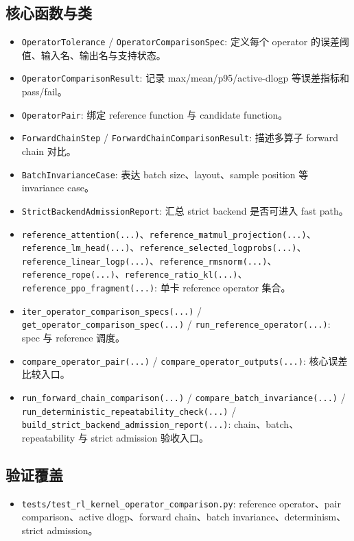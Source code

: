 \documentclass[11pt,a4paper]{ctexart}
\newcommand{\code}[1]{{\small\nolinkurl{#1}}}
\begin{document}
\subsection{核心函数与类}
\begin{itemize}
  \item \code{OperatorTolerance} / \code{OperatorComparisonSpec}: 定义每个 operator 的误差阈值、输入名、输出名与支持状态。
  \item \code{OperatorComparisonResult}: 记录 max/mean/p95/active-dlogp 等误差指标和 pass/fail。
  \item \code{OperatorPair}: 绑定 reference function 与 candidate function。
  \item \code{ForwardChainStep} / \code{ForwardChainComparisonResult}: 描述多算子 forward chain 对比。
  \item \code{BatchInvarianceCase}: 表达 batch size、layout、sample position 等 invariance case。
  \item \code{StrictBackendAdmissionReport}: 汇总 strict backend 是否可进入 fast path。
  \item \code{reference_attention(...)}、\code{reference_matmul_projection(...)}、\code{reference_lm_head(...)}、\code{reference_selected_logprobs(...)}、\code{reference_linear_logp(...)}、\code{reference_rmsnorm(...)}、\code{reference_rope(...)}、\code{reference_ratio_kl(...)}、\code{reference_ppo_fragment(...)}: 单卡 reference operator 集合。
  \item \code{iter_operator_comparison_specs(...)} / \code{get_operator_comparison_spec(...)} / \code{run_reference_operator(...)}: spec 与 reference 调度。
  \item \code{compare_operator_pair(...)} / \code{compare_operator_outputs(...)}: 核心误差比较入口。
  \item \code{run_forward_chain_comparison(...)} / \code{compare_batch_invariance(...)} / \code{run_deterministic_repeatability_check(...)} / \code{build_strict_backend_admission_report(...)}: chain、batch、repeatability 与 strict admission 验收入口。
\end{itemize}

\subsection{验证覆盖}
\begin{itemize}
  \item \code{tests/test_rl_kernel_operator_comparison.py}: reference operator、pair comparison、active dlogp、forward chain、batch invariance、determinism、strict admission。
\end{itemize}
\end{document}
